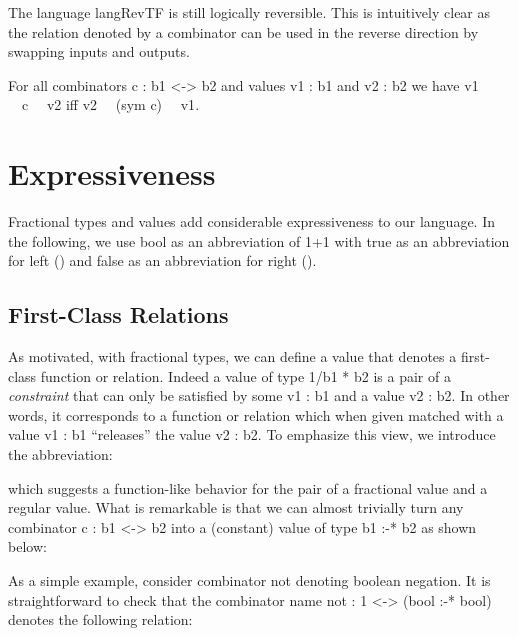 \documentclass{llncs}
\begin{document}
The language {{langRevTF}} is still logically reversible. This is intuitively
clear as the relation denoted by a combinator can be used in the reverse
direction by swapping inputs and outputs.

\begin{proposition}
\label{chx:prop:logrev-tracep}
For all combinators {{c : b1 <-> b2}} and values {{v1 : b1}} and 
{{v2 : b2}} we have {{v1 ~~c~~ v2}} iff {{v2 ~~(sym c)~~ v1}}.
\end{proposition}

\section{Expressiveness} 

Fractional types and values add considerable expressiveness to our
language. In the following, we use {{bool}} as an abbreviation of {{1+1}} 
with {{true}} as an abbreviation for {{left ()}} and {{false}} as an 
abbreviation for {{right ()}}.

\subsection{First-Class Relations}

As motivated, with fractional types, we can define a value that denotes a
first-class function or relation. Indeed a value of type {{1/b1 * b2}} is a
pair of a \emph{constraint} that can only be satisfied by some {{v1 : b1}}
and a value {{v2 : b2}}. In other words, it corresponds to a function or
relation which when given matched with a value {{v1 : b1}} ``releases'' the
value {{v2 : b2}}. To emphasize this view, we introduce the abbreviation:


\noindent which suggests a function-like behavior for the pair of a fractional value
and a regular value. What is remarkable is that we can almost trivially turn
any combinator {{c : b1 <-> b2}} into a (constant) value of 
type {{b1 :-* b2}} as shown below:


As a simple example, consider combinator {{not}} denoting boolean negation.
It is straightforward to check that the combinator 
{{name not : 1 <-> (bool :-* bool)}} denotes the following
relation:
\end{document}
